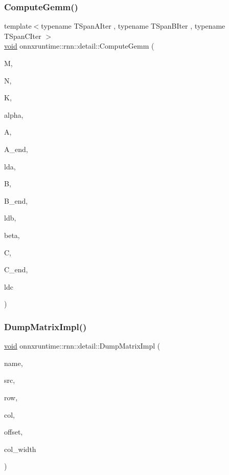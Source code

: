 \subsubsection{\texorpdfstring{Compute\+Gemm()}{ComputeGemm()}}
{\footnotesize\ttfamily template$<$typename T\+Span\+A\+Iter , typename T\+Span\+B\+Iter , typename T\+Span\+C\+Iter $>$ \\
\mbox{\hyperlink{mlasi_8h_a88f941d423cb2a819b70a1358982b1a6}{void}} onnxruntime\+::rnn\+::detail\+::\+Compute\+Gemm (\begin{DoxyParamCaption}\item[{const int}]{M,  }\item[{const int}]{N,  }\item[{const int}]{K,  }\item[{const float}]{alpha,  }\item[{T\+Span\+A\+Iter}]{A,  }\item[{T\+Span\+A\+Iter}]{A\+\_\+end,  }\item[{const int}]{lda,  }\item[{T\+Span\+B\+Iter}]{B,  }\item[{T\+Span\+B\+Iter}]{B\+\_\+end,  }\item[{const int}]{ldb,  }\item[{const float}]{beta,  }\item[{T\+Span\+C\+Iter}]{C,  }\item[{T\+Span\+C\+Iter}]{C\+\_\+end,  }\item[{const int}]{ldc }\end{DoxyParamCaption})}

\mbox{\label{namespaceonnxruntime_1_1rnn_1_1detail_adb3b48ba8d1bafa2344de37a71e96690}} 
\subsubsection{\texorpdfstring{Dump\+Matrix\+Impl()}{DumpMatrixImpl()}}
{\footnotesize\ttfamily \mbox{\hyperlink{mlasi_8h_a88f941d423cb2a819b70a1358982b1a6}{void}} onnxruntime\+::rnn\+::detail\+::\+Dump\+Matrix\+Impl (\begin{DoxyParamCaption}\item[{const std\+::string \&}]{name,  }\item[{const float $\ast$}]{src,  }\item[{int}]{row,  }\item[{int}]{col,  }\item[{int}]{offset,  }\item[{int}]{col\+\_\+width }\end{DoxyParamCaption})}

